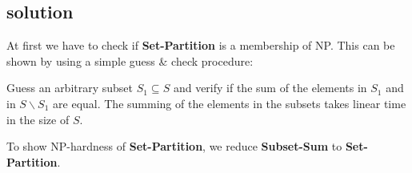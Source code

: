 % 
% 
% 
% 
% 
% 
% 

\subsection{solution}
At first we have to check if \textbf{Set-Partition} is a membership of NP.%
\newline
This can be shown by using a simple guess \& check procedure:\newline

Guess an arbitrary subset $S_1\subseteq S$ and verify if the sum of the
elements in $S_1$ and in $S\backslash S_1$ are equal. The summing of the
elements in the subsets takes linear time in the size of $S$.

To show NP-hardness of \textbf{Set-Partition}, we reduce \textbf{Subset-Sum} to \textbf{Set-Partition}.

